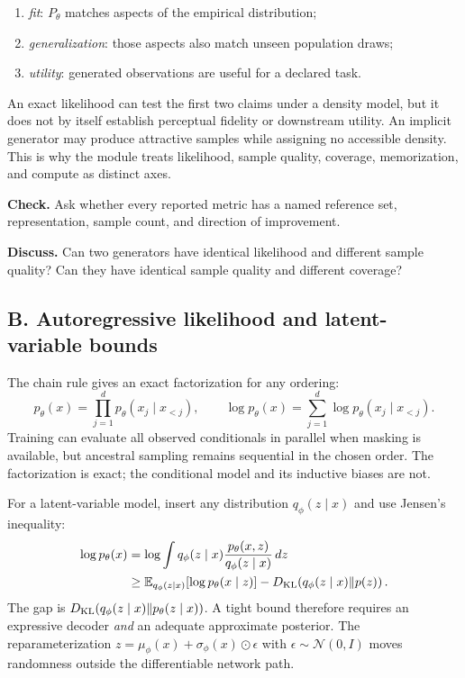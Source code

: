\documentclass[11pt]{article}
\newcommand{\E}{\mathbb{E}}
\begin{document}
\begin{enumerate}
\item \emph{fit}: $P_\theta$ matches aspects of the empirical distribution;
\item \emph{generalization}: those aspects also match unseen population draws;
\item \emph{utility}: generated observations are useful for a declared task.
\end{enumerate}

An exact likelihood can test the first two claims under a density model, but it
does not by itself establish perceptual fidelity or downstream utility. An
implicit generator may produce attractive samples while assigning no accessible
density. This is why the module treats likelihood, sample quality, coverage,
memorization, and compute as distinct axes.

\textbf{Check.} Ask whether every reported metric has a named reference set,
representation, sample count, and direction of improvement.

\textbf{Discuss.} Can two generators have identical likelihood and different
sample quality? Can they have identical sample quality and different coverage?

\subsection*{B. Autoregressive likelihood and latent-variable bounds}

The chain rule gives an exact factorization for any ordering:
\[
 p_\theta(x)=\prod_{j=1}^d p_\theta(x_j\mid x_{<j}),\qquad
 \log p_\theta(x)=\sum_{j=1}^d\log p_\theta(x_j\mid x_{<j}).
\]
Training can evaluate all observed conditionals in parallel when masking is
available, but ancestral sampling remains sequential in the chosen order. The
factorization is exact; the conditional model and its inductive biases are not.

For a latent-variable model, insert any distribution $q_\phi(z\mid x)$ and use
Jensen's inequality:
\begin{align*}
 \log p_\theta(x)
 &=\log\int q_\phi(z\mid x)
   \frac{p_\theta(x,z)}{q_\phi(z\mid x)}\,dz\\
 &\geq \E_{q_\phi(z\mid x)}[\log p_\theta(x\mid z)]
 -D_{\rm KL}\!\left(q_\phi(z\mid x)\Vert p(z)\right).
\end{align*}
The gap is $D_{\rm KL}(q_\phi(z\mid x)\Vert p_\theta(z\mid x))$. A tight
bound therefore requires an expressive decoder \emph{and} an adequate
approximate posterior. The reparameterization
$z=\mu_\phi(x)+\sigma_\phi(x)\odot\epsilon$ with
$\epsilon\sim\mathcal N(0,I)$ moves randomness outside the differentiable
network path.
\end{document}
